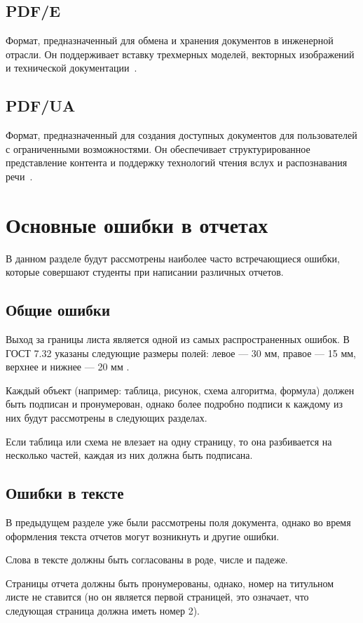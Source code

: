 \subsection{PDF/E}
Формат, предназначенный для обмена и хранения документов в инженерной отрасли. Он поддерживает вставку трехмерных моделей, векторных изображений и технической документации~\cite{abdobe_PDF}.
\subsection{PDF/UA}
Формат, предназначенный для создания доступных документов для пользователей с ограниченными возможностями. Он обеспечивает структурированное представление контента и поддержку технологий чтения вслух и распознавания речи~\cite{abdobe_PDF}.






\section{Основные ошибки в отчетах}
В данном разделе будут рассмотрены наиболее часто встречающиеся ошибки, которые совершают студенты при написании различных отчетов.

\subsection{Общие ошибки}
Выход за границы листа является одной из самых распространенных ошибок. В ГОСТ 7.32 указаны следующие размеры полей: левое — 30 мм, правое — 15 мм, верхнее и нижнее — 20 мм \cite{GOST732}. 

Каждый объект (например: таблица, рисунок, схема алгоритма, формула) должен быть подписан и пронумерован, однако более подробно подписи к каждому из них будут рассмотрены в следующих разделах.

Если таблица или схема не влезает на одну страницу, то она разбивается на несколько частей, каждая из них должна быть подписана.

\subsection{Ошибки в тексте}
В предыдущем разделе уже были рассмотрены поля документа, однако во время оформления текста отчетов могут возникнуть и другие ошибки.

Слова в тексте должны быть согласованы в роде, числе и падеже.

Страницы отчета должны быть пронумерованы, однако, номер на титульном листе не ставится (но он является первой страницей, это означает, что следующая страница должна иметь номер 2).

